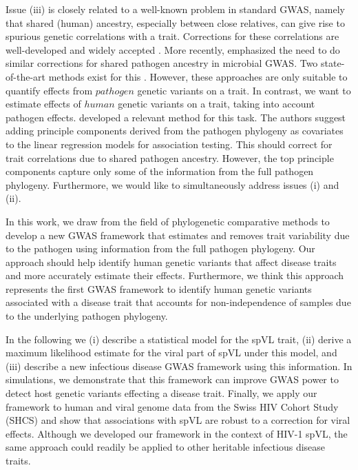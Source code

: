 \documentclass[]{article}
\begin{document}
\begin{doublespace}
Issue (iii) is closely related to a well-known problem in standard GWAS, namely that shared (human) ancestry, especially between close relatives, can give rise to spurious genetic correlations with a trait. Corrections for these correlations are well-developed and widely accepted  \citep{Astle2009, Price2006}. More recently, \citep{Power2016} emphasized the need to do similar corrections for shared pathogen ancestry in microbial GWAS. Two state-of-the-art methods exist for this \citep{Earle2016, collins_phylogenetic_nodate}. 
However, these approaches are only suitable to quantify effects from $pathogen$ genetic variants on a trait. In contrast, we want to estimate effects of $human$ genetic variants on a trait, taking into account pathogen effects. \citep{Naret2018} developed a relevant method for this task. The authors suggest adding principle components derived from the pathogen phylogeny as covariates to the linear regression models for association testing. This should correct for trait correlations due to shared pathogen ancestry. However, the top principle components capture only some of the information from the full pathogen phylogeny. Furthermore, we would like to simultaneously address issues (i) and (ii).

In this work,  we draw from the field of phylogenetic comparative methods to develop a new GWAS framework that estimates and removes trait variability due to the pathogen using information from the full pathogen phylogeny. Our approach should help identify human genetic variants that affect disease traits and more accurately estimate their effects. Furthermore, we think this approach represents the first GWAS framework to identify human genetic variants associated with a disease trait that accounts for non-independence of samples due to the underlying pathogen phylogeny. 

In the following we (i) describe a statistical model for the spVL trait, (ii) derive a maximum likelihood estimate for the viral part of spVL under this model, and (iii) describe a new infectious disease GWAS framework using this information. In simulations, we demonstrate that this framework can improve GWAS power to detect host genetic variants effecting a disease trait. Finally, we apply our framework to human and viral genome data from the Swiss HIV Cohort Study (SHCS) and show that associations with spVL are robust to a correction for viral effects. Although we developed our framework in the context of HIV-1 spVL, the same approach could readily be applied to other heritable infectious disease traits. 


\end{doublespace}
\end{document}
